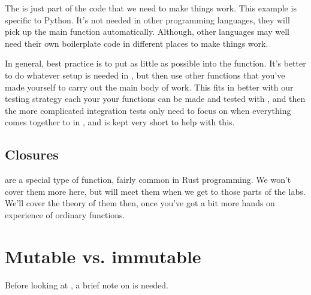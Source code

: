 \documentclass[letterpaper,10pt,british]{sphinxmanual}
\begin{document}
\sphinxAtStartPar
The  is just part of the  code that we need to make things work. This example is specific to Python. It’s not needed in other programming languages, they will pick up the main function automatically. Although, other languages may well need their own boilerplate code in different places to make things work.

\sphinxAtStartPar
In general, best practice is to put as little as possible into the  function. It’s better to do whatever setup is needed in , but then use other functions that you’ve made yourself to carry out the main body of work. This fits in better with our testing strategy \sphinxhyphen{} each your your functions can be made and tested with {\hyperref[\detokenize{chapters/software_development_tools/automated_testing:unit-testing}]{}}, and then the more complicated integration tests only need to focus on when everything comes together to in , and  is kept very short to help with this.


\subsection{Closures}
\label{\detokenize{chapters/programming_fundamentals/functions:closures}}
\sphinxAtStartPar
{} are a special type of function, fairly common in Rust programming. We won’t cover them more here, but will meet them when we get to those parts of the labs. We’ll cover the theory of them then, once you’ve got a bit more hands on experience of ordinary functions.

\sphinxstepscope


\section{Mutable vs. immutable}
\label{\detokenize{chapters/programming_fundamentals/mutability:mutable-vs-immutable}}\label{\detokenize{chapters/programming_fundamentals/mutability::doc}}
\sphinxAtStartPar
Before looking at {\hyperref[\detokenize{chapters/programming_fundamentals/variables:variables}]{}}, a brief note on  is needed.
\end{document}
